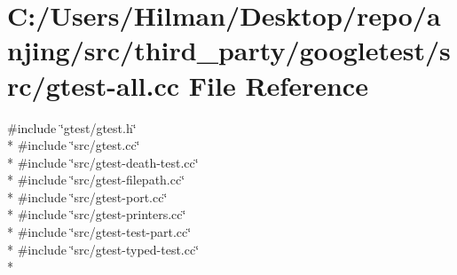 \hypertarget{gtest-all_8cc}{}\section{C\+:/\+Users/\+Hilman/\+Desktop/repo/anjing/src/third\+\_\+party/googletest/src/gtest-\/all.cc File Reference}
\label{gtest-all_8cc}
{\ttfamily \#include \char`\"{}gtest/gtest.\+h\char`\"{}}\\*
{\ttfamily \#include \char`\"{}src/gtest.\+cc\char`\"{}}\\*
{\ttfamily \#include \char`\"{}src/gtest-\/death-\/test.\+cc\char`\"{}}\\*
{\ttfamily \#include \char`\"{}src/gtest-\/filepath.\+cc\char`\"{}}\\*
{\ttfamily \#include \char`\"{}src/gtest-\/port.\+cc\char`\"{}}\\*
{\ttfamily \#include \char`\"{}src/gtest-\/printers.\+cc\char`\"{}}\\*
{\ttfamily \#include \char`\"{}src/gtest-\/test-\/part.\+cc\char`\"{}}\\*
{\ttfamily \#include \char`\"{}src/gtest-\/typed-\/test.\+cc\char`\"{}}\\*

